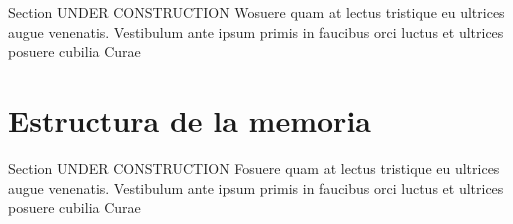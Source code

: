 Section UNDER CONSTRUCTION Wosuere quam at lectus tristique eu ultrices augue venenatis. Vestibulum ante ipsum primis in faucibus orci luctus et ultrices posuere cubilia Curae


\section{Estructura de la memoria}

Section UNDER CONSTRUCTION Fosuere quam at lectus tristique eu ultrices augue venenatis. Vestibulum ante ipsum primis in faucibus orci luctus et ultrices posuere cubilia Curae

